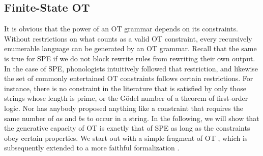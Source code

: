 \subsection{Finite-State OT}

It is obvious that the power of an OT grammar depends on its constraints.
Without restrictions on what counts as a valid OT constraint, every recursively enumerable language can be generated by an OT grammar.
Recall that the same is true for SPE if we do not block rewrite rules from rewriting their own output.
In the case of SPE, phonologists intuitively followed that restriction, and likewise the set of commonly entertained OT constraints follows certain restrictions.
For instance, there is no constraint in the literature that is satisfied by only those strings whose length is prime, or the Gödel number of a theorem of first-order logic.
Nor has anybody proposed anything like a constraint that requires the same number of $a$s and $b$s to occur in a string.
In the following, we will show that the generative capacity of OT is exactly that of SPE as long as the constraints obey certain properties.
We start out with a simple fragment of OT \citep{FrankSatta98,Karttunen98}, which is subsequently extended to a more faithful formalization \citep{Jaeger02}.

